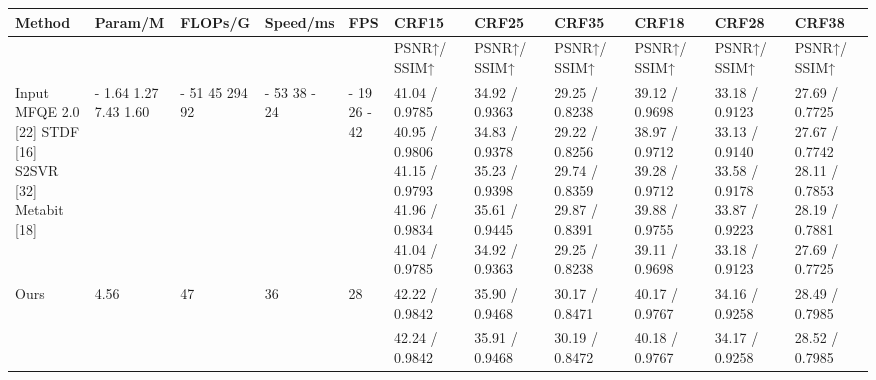 \begin{tabular}{lllllllllll}
\toprule
Method & Param/M & FLOPs/G & Speed/ms & FPS & CRF15 & CRF25 & CRF35 & CRF18 & CRF28 & CRF38 \\
\midrule
 &  &  &  &  & PSNR↑/ SSIM↑ & PSNR↑/ SSIM↑ & PSNR↑/ SSIM↑ & PSNR↑/ SSIM↑ & PSNR↑/ SSIM↑ & PSNR↑/ SSIM↑ \\
Input MFQE 2.0 [22] STDF [16] S2SVR [32] Metabit [18] & - 1.64 1.27 7.43 1.60 & - 51 45 294 92 & - 53 38 - 24 & - 19 26 - 42 & 41.04 / 0.9785 40.95 / 0.9806 41.15 / 0.9793 41.96 / 0.9834 41.04 / 0.9785 & 34.92 / 0.9363 34.83 / 0.9378 35.23 / 0.9398 35.61 / 0.9445 34.92 / 0.9363 & 29.25 / 0.8238 29.22 / 0.8256 29.74 / 0.8359 29.87 / 0.8391 29.25 / 0.8238 & 39.12 / 0.9698 38.97 / 0.9712 39.28 / 0.9712 39.88 / 0.9755 39.11 / 0.9698 & 33.18 / 0.9123 33.13 / 0.9140 33.58 / 0.9178 33.87 / 0.9223 33.18 / 0.9123 & 27.69 / 0.7725 27.67 / 0.7742 28.11 / 0.7853 28.19 / 0.7881 27.69 / 0.7725 \\
Ours & 4.56 & 47 & 36 & 28 & 42.22 / 0.9842 & 35.90 / 0.9468 & 30.17 / 0.8471 & 40.17 / 0.9767 & 34.16 / 0.9258 & 28.49 / 0.7985 \\
 &  &  &  &  & 42.24 / 0.9842 & 35.91 / 0.9468 & 30.19 / 0.8472 & 40.18 / 0.9767 & 34.17 / 0.9258 & 28.52 / 0.7985 \\
\bottomrule
\end{tabular}
